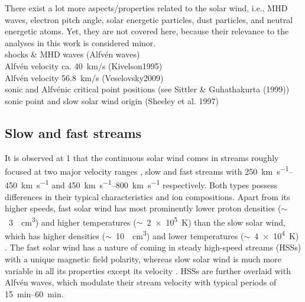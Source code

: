 There exist a lot more aspects/properties related to the solar wind, i.e., MHD waves, electron pitch angle, solar energetic particles, dust particles, and neutral energetic atoms. Yet, they are not covered here, because their relevance to the analyses in this work is considered minor.\\


shocks \& MHD waves (Alfvén waves)\\
Alfvén velocity ca. 40~km/s (Kivelson1995)\\
Alfvén velocity 56.8~km/s (Veselovsky2009)\\

sonic and Alfvénic critical point positions (see Sittler \& Guhathakurta (1999))\\
sonic point and slow solar wind origin (Sheeley et al. 1997)\\


\subsection{Slow and fast streams}
\label{sec:slow_and_fast_streams}
It is observed at \SI{1}{\au} that the continuous solar wind comes in streams roughly focused at two major velocity ranges \citep{Neugebauer1966,Schwenn1983}, slow and fast streams with \SIrange{250}{450}{\km\per\s} and \SIrange{450}{800}{\km\per\s} respectively. Both types possess differences in their typical characteristics and ion compositions. Apart from its higher speeds, fast solar wind has most prominently lower proton densities ($\sim$~\SI{3}{\per\cm\cubed}) and higher temperatures ($\sim$~\SI{2e5}{\K}) than the slow solar wind, which has higher densities ($\sim$~\SI{10}{\per\cm\cubed}) and lower temperatures ($\sim$~\SI{4e4}{\K}) \citep{Schwenn1990}. The fast solar wind has a nature of coming in steady high-speed streams (HSSs) with a unique magnetic field polarity, whereas slow solar wind is much more variable in all its properties except its velocity \citep{Bame1977}. HSSs are further overlaid with Alfvén waves, which modulate their stream velocity with typical periods of \SIrange{15}{60}{\minute}.


